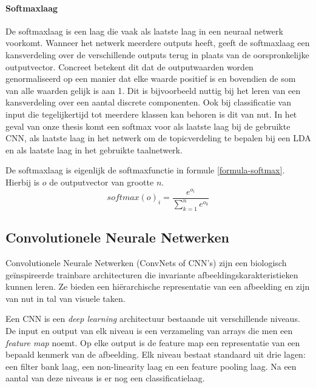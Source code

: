\paragraph{Softmaxlaag}
De softmaxlaag is een laag die vaak als laatste laag in een neuraal netwerk voorkomt. Wanneer het netwerk meerdere outputs heeft, geeft de softmaxlaag een kansverdeling over de verschillende outputs terug in plaats van de oorspronkelijke outputvector. Concreet betekent dit dat de outputwaarden worden genormaliseerd op een manier dat elke waarde positief is en bovendien de som van alle waarden gelijk is aan 1. Dit is bijvoorbeeld nuttig bij het leren van een kansverdeling over een aantal discrete componenten. Ook bij classificatie van input die tegelijkertijd tot meerdere klassen kan behoren is dit van nut.
In het geval van onze thesis komt een softmax voor als laatste laag bij de gebruikte CNN, als laatste laag in het netwerk om de topicverdeling te bepalen bij een LDA en als laatste laag in het gebruikte taalnetwerk.

De softmaxlaag is eigenlijk de softmaxfunctie in formule \ref{formula-softmax}. Hierbij is $o$ de outputvector van grootte $n$.
\begin{equation}
softmax(o)_i = \frac{e^{o_i}}{\sum^{n}_{k=1}{e^{o_k}}}
\label{formula-softmax}
\end{equation}


\subsection{Convolutionele Neurale Netwerken}
\label{sec:CNN}
Convolutionele Neurale Netwerken (ConvNets of CNN's) zijn een biologisch ge\" inspireerde trainbare architecturen die invariante afbeeldingskarakteristieken kunnen leren.\cite{LeCun2010} Ze bieden een hi\"erarchische representatie van een afbeelding en zijn van nut in tal van visuele taken.\cite{Girshick2014}\cite{Ciresan2012}\cite{Zhou2015}

Een CNN is een \emph{deep learning} architectuur bestaande uit verschillende niveaus. De input en output van elk niveau is een verzameling van arrays die men een \emph{feature map} noemt. Op elke output is de feature map een representatie van een bepaald kenmerk van de afbeelding. Elk niveau bestaat standaard uit drie lagen: een filter bank laag, een non-linearity laag en een feature pooling laag. Na een aantal van deze niveaus is er nog een classificatielaag.

